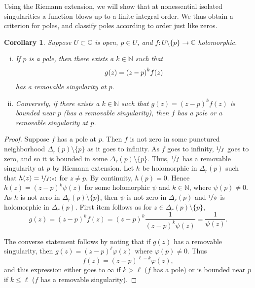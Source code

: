 \documentclass[12pt,openany]{book}
\newcommand{\avoidbreak}{\postdisplaypenalty=100}
\newcommand{\C}{{\mathbb{C}}}
\newcommand{\N}{{\mathbb{N}}}
\theoremstyle{plain}
\newtheorem{cor}[thm]{Corollary}
\theoremstyle{remark}
\theoremstyle{definition}
\theoremstyle{exercise}
\theoremstyle{example}
\begin{document}
Using the Riemann extension, we will show that
at nonessential isolated singularities
a function blows up to a finite integral order.
We thus obtain a criterion for poles, and classify
poles according to order just like zeros.

\begin{cor}
\pagebreak[2]
Suppose $U \subset \C$ is open, $p \in U$,
and $f \colon U \setminus \{p\} \to \C$ holomorphic.
\begin{enumerate}[(i)]
\item
If $p$ is a pole, then there exists a $k \in \N$ such that
\begin{equation*}
g(z) = {(z-p)}^k f(z)
\avoidbreak
\end{equation*}
has a removable singularity at $p$.
\item
Conversely, if there exists a $k \in \N$ such that
$g(z) = {(z-p)}^k f(z)$ is bounded near $p$ (has a removable singularity),
then $f$ has a pole or a
removable singularity at $p$.
\end{enumerate}
\end{cor}

\begin{proof}
Suppose $f$ has a pole at $p$.
Then $f$ is not zero in some
punctured neighborhood $\Delta_r(p) \setminus \{p\}$ as it goes to infinity.
As $f$ goes to infinity,
$\nicefrac{1}{f}$ goes to zero, and so it is bounded in some $\Delta_r(p)
\setminus \{p\}$.
Thus, $\nicefrac{1}{f}$ has a removable singularity at $p$ by Riemann extension.
Let $h$ be holomorphic in $\Delta_r(p)$
such that $h(z) = \nicefrac{1}{f(z)}$ for $z \not= p$.  By continuity, $h(p) =
0$.  Hence $h(z) = {(z-p)}^k \psi(z)$ for some holomorphic $\psi$ and $k \in \N$,
where $\psi(p) \not= 0$.
As $h$ is not zero in $\Delta_r(p) \setminus \{p\}$,
then $\psi$ is not zero in $\Delta_r(p)$
and $\nicefrac{1}{\psi}$ is holomorphic in $\Delta_r(p)$.
First item follows as
for $z \in \Delta_r(p) \setminus \{p\}$,
\begin{equation*}
g(z) = {(z-p)}^k f(z)
=
{(z-p)}^k \frac{1}{{(z-p)}^k \psi(z)}
=
\frac{1}{\psi(z)} .
\end{equation*}

The converse statement follows by noting that if $g(z)$ has a removable
singularity, then $g(z) = {(z-p)}^\ell \varphi(z)$ where
$\varphi(p) \not= 0$.
Thus
\begin{equation*}
f(z) = {(z-p)}^{\ell-k} \varphi(z) ,
\end{equation*}
and this expression either goes to $\infty$ if $k > \ell$ ($f$ has a pole) or is
bounded near $p$ if $k \leq \ell$ ($f$ has a removable singularity).
\end{proof}
\end{document}
